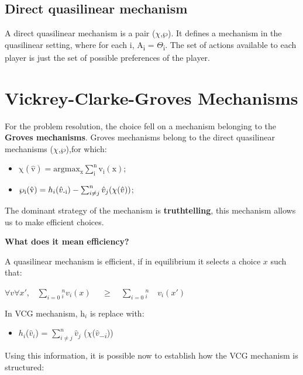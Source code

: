 \documentclass[12pt]{article}
\begin{document}
\subsection{Direct quasilinear mechanism}
A direct quasilinear mechanism is a pair ($\chi$,$\wp$). It defines a mechanism in the quasilinear setting, where for each i, A\textsubscript{i} = $\Theta$\textsubscript{i}.
The set of actions available to each player is just the set of possible preferences of the player.
\newpage
\section{Vickrey-Clarke-Groves Mechanisms}
For the problem resolution, the choice fell on a mechanism belonging to the \textbf{Groves mechanisms}. Groves mechanisms belong to the direct quasilinear mechanisms ($\chi$,$\wp$),for which:

\begin{itemize}
\centering
    \item $\mathrm{\chi({\hat{v}}) = arg max_x\sum_{i}^n v_i(x)}$;  

    \item $\mathrm{\wp_i({\hat{v}})} = h_i(\hat{v}\textsubscript{-i}) - \sum_{i\neq j}^n \hat{v}_j(\chi(\hat{v}))$;\par
    
\end{itemize}

The dominant strategy of the mechanism is \textbf{truthtelling}, this mechanism allows us to make efficient choices.
\begin{center}
    \textbf{What does it mean efficiency?\\}
\end{center} 

A quasilinear mechanism is efficient, if in equilibrium it selects a choice $x$ such that:
\centering
\vspace*{ 10 mm}

$\forall{v}\forall{x'}$,$\quad\sum_{i=0}$$^n_i v_i(x)$
$\quad\geq$$\quad\sum_{i=0}$$^n_i \quad v_i(x')$ \\
\vspace*{8 mm} 

In VCG mechanism, h$_i$ is replace with:

\begin{itemize}
\centering
    \item $h_i$($\hat{v}_i$) 
=     $\sum_{i\neq j}^n$$\hat{v}_j$
        ($\chi$($\hat{v}$\textsubscript{$-i$}))
\end{itemize}
\hfill 
\newline
Using this information, it is possible now to establish how the VCG mechanism is structured:
\end{document}
